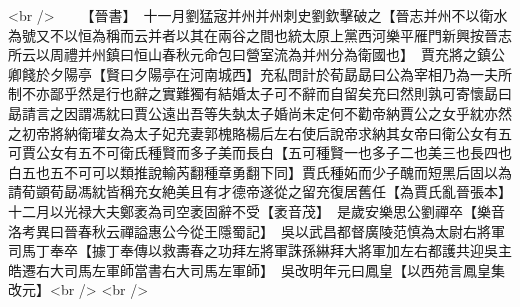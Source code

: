 <br />
　　【晉書】　十一月劉猛宼并州并州刺史劉欽擊破之【晉志并州不以衛水為號又不以恒為稱而云并者以其在兩谷之間也統太原上黨西河樂平雁門新興按晉志所云以周禮并州鎮曰恒山春秋元命包曰營室流為并州分為衛國也】　賈充將之鎮公卿餞於夕陽亭【賢曰夕陽亭在河南城西】充私問計於荀勗勗曰公為宰相乃為一夫所制不亦鄙乎然是行也辭之實難獨有結婚太子可不辭而自留矣充曰然則孰可寄懷勗曰勗請言之因謂馮紞曰賈公遠出吾等失埶太子婚尚未定何不勸帝納賈公之女乎紞亦然之初帝將納衛瓘女為太子妃充妻郭槐賂楊后左右使后說帝求納其女帝曰衛公女有五可賈公女有五不可衛氏種賢而多子美而長白【五可種賢一也多子二也美三也長四也白五也五不可可以類推說輸芮翻種章勇翻下同】賈氏種妬而少子醜而短黑后固以為請荀顗荀勗馮紞皆稱充女絶美且有才德帝遂從之留充復居舊任【為賈氏亂晉張本】　十二月以光禄大夫鄭袤為司空袤固辭不受【袤音茂】　是歲安樂思公劉禪卒【樂音洛考異曰晉春秋云禪謚惠公今從王隱蜀記】　吳以武昌都督廣陵范慎為太尉右將軍司馬丁奉卒【據丁奉傳以救夀春之功拜左將軍誅孫綝拜大將軍加左右都護共迎吳主皓遷右大司馬左軍師當書右大司馬左軍師】　吳改明年元曰鳳皇【以西苑言鳳皇集改元】<br />
<br />
